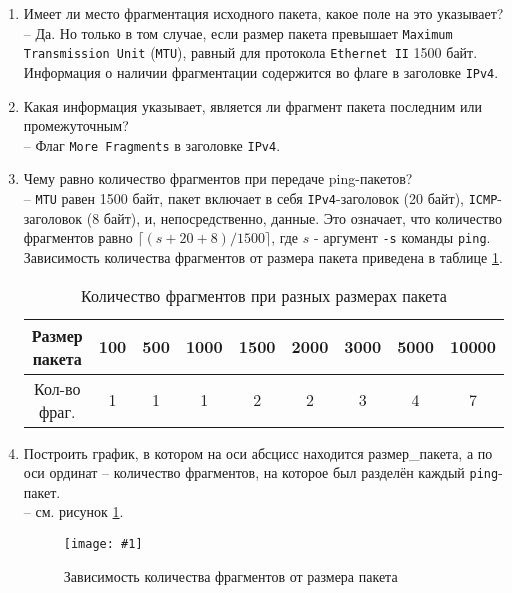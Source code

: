 \documentclass[12pt, a4paper]{article}
\newcommand{\figc}[4]{
  \begin{figure}[H]
  \begin{center}
    \texttt{[image: \#1]}
    \caption{#2}
    \label{fig:#3}
  \end{center}
  \end{figure}
}
\begin{document}
\begin{enumerate}
  \item Имеет ли место фрагментация исходного пакета, какое поле на это указывает?\\
    -- Да. Но только в том случае, если размер пакета превышает \texttt{Maximum
    Transmission Unit} (\texttt{MTU}), равный для протокола \texttt{Ethernet II}
    1500 байт. Информация о наличии фрагментации содержится во флаге в заголовке
    \texttt{IPv4}.
  \item Какая информация указывает, является ли фрагмент пакета последним или
    промежуточным?\\
    -- Флаг \texttt{More Fragments} в заголовке \texttt{IPv4}.
  \item Чему равно количество фрагментов при передаче ping-пакетов?\\
    -- \texttt{MTU} равен 1500 байт, пакет включает в себя \texttt{IPv4}-заголовок
    (20 байт), \texttt{ICMP}-заголовок (8 байт), и, непосредственно, данные.
    Это означает, что количество фрагментов равно $\lceil ( s + 20 + 8 ) / 1500 \rceil$,
    где $s$ - аргумент \texttt{-s} команды \texttt{ping}. Зависимость количества
    фрагментов от размера пакета приведена в таблице \ref{Tab:frag}.

    \begin{table}[h]
    \begin{center}
    \begin{small}
      \caption{Количество фрагментов при разных размерах пакета}
      \begin{tabular}{| c | c | c | c | c | c | c | c | c |}
        \hline
        Размер пакета & 100 &	500 & 1000 & 1500 & 2000 & 3000 & 5000 & 10000\\
        \hline
        Кол-во фраг. & 1 & 1 & 1 & 2 & 2 & 3 & 4 & 7\\
        \hline
      \end{tabular}
      \label{Tab:frag}
    \end{small}
    \end{center}
    \end{table}
  \item  Построить график, в котором на оси абсцисс находится размер\_пакета,
    а по оси ординат -- количество фрагментов, на которое был разделён каждый
    \texttt{ping}-пакет.\\
    -- см. рисунок \ref{fig:frag}.
    \figc{frag}{Зависимость количества фрагментов от размера пакета}{frag}{0.8}


\end{enumerate}
\end{document}
